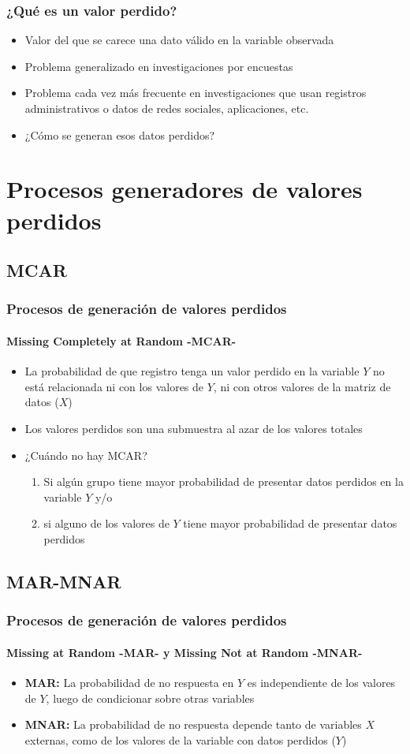 \documentclass{beamer}
\begin{document}
\begin{frame}
\frametitle{¿Qué es un valor perdido?}
	\begin{itemize}
		\item{Valor del que se carece una dato válido en la variable observada}
		\item{Problema generalizado en investigaciones por encuestas}
		\item{Problema cada vez más frecuente en investigaciones que usan registros administrativos o datos de redes sociales, aplicaciones, etc.}
		\item{¿Cómo se generan esos datos perdidos?}
	\end{itemize}
\end{frame}

\section{Procesos generadores de valores perdidos}
\subsection{MCAR}
\begin{frame}
	\frametitle{Procesos de generación de valores perdidos}
	\framesubtitle{Missing Completely at Random -MCAR-}
	\begin{itemize}
		\item{La probabilidad de que registro tenga un valor perdido en la variable $Y$ no está relacionada ni con los valores de $Y$, ni con otros valores de la matriz de datos ($X$)}
		\item{Los valores perdidos son una submuestra al azar de los valores totales}
		\item{¿Cuándo no hay MCAR?}
			\begin{enumerate}
			\item{Si algún grupo tiene mayor probabilidad de presentar datos perdidos en la variable $Y$ y/o} 
			\item{si alguno de los valores de $Y$ tiene mayor probabilidad de presentar datos perdidos}
			\end{enumerate}

	\end{itemize}
\end{frame}

\subsection{MAR-MNAR}
\begin{frame}
	\frametitle{Procesos de generación de valores perdidos}
	\framesubtitle{Missing at Random -MAR- y Missing Not at Random -MNAR-}
	\begin{itemize}
		\item{\textbf{MAR:} La probabilidad de no respuesta en $Y$ es independiente de los valores de $Y$, luego de condicionar sobre otras variables}
		\item{\textbf{MNAR:} La probabilidad de no respuesta depende tanto de variables $X$ externas, como de los valores de la variable con datos perdidos ($Y$)}
	\end{itemize}
\end{frame}
\end{document}
